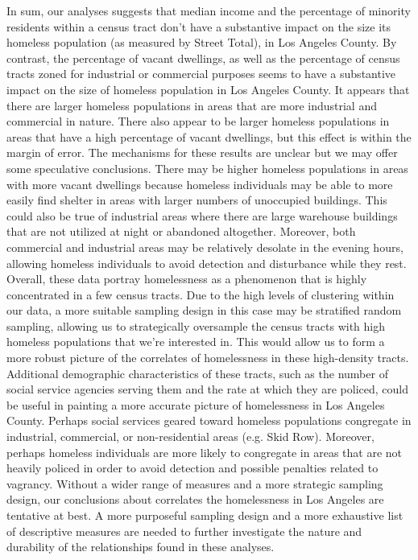 \documentclass[titlepage]{article}   	%
\begin{document}
\indent In sum, our analyses suggests that median income and the percentage of minority residents within a census tract don’t have a substantive impact on the size its homeless population (as measured by Street Total), in Los Angeles County. By contrast, the percentage of vacant dwellings, as well as the percentage of census tracts zoned for industrial or commercial purposes seems to have a substantive impact on the size of homeless population in Los Angeles County. It appears that there are larger homeless populations in areas that are more industrial and commercial in nature. There also appear to be larger homeless populations in areas that have a high percentage of vacant dwellings, but this effect is within the margin of error. The mechanisms for these results are unclear but we may offer some speculative conclusions. There may be higher homeless populations in areas with more vacant dwellings because homeless individuals may be able to more easily find shelter in areas with larger numbers of unoccupied buildings. This could also be true of industrial areas where there are large warehouse buildings that are not utilized at night or abandoned altogether. Moreover, both commercial and industrial areas may be relatively desolate in the evening hours, allowing homeless individuals to avoid detection and disturbance while they rest. Overall, these data portray homelessness as a phenomenon that is highly concentrated in a few census tracts. Due to the high levels of clustering within our data, a more suitable sampling design in this case may be stratified random sampling, allowing us to strategically oversample the census tracts with high homeless populations that we’re interested in. This would allow us to form a more robust picture of the correlates of homelessness in these high-density tracts. Additional demographic characteristics of these tracts, such as the number of social service agencies serving them and the rate at which they are policed, could be useful in painting a more accurate picture of homelessness in Los Angeles County. Perhaps social services geared toward homeless populations congregate in industrial, commercial, or non-residential areas (e.g. Skid Row). Moreover, perhaps homeless individuals are more likely to congregate in areas that are not heavily policed in order to avoid detection and possible penalties related to vagrancy. Without a wider range of measures and a more strategic sampling design, our conclusions about correlates the homelessness in Los Angeles are tentative at best. A more purposeful sampling design and a more exhaustive list of descriptive measures are needed to further investigate the nature and durability of the relationships found in these analyses. 
\end{document}
